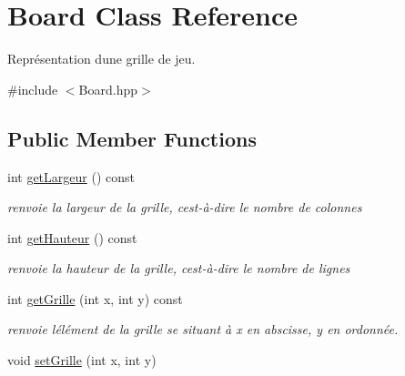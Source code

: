 \hypertarget{classBoard}{}\section{Board Class Reference}
\label{classBoard}


Représentation d\textquotesingle{}une grille de jeu.  




{\ttfamily \#include $<$Board.\+hpp$>$}

\subsection*{Public Member Functions}
\begin{DoxyCompactItemize}
\item 
\mbox{\label{classBoard_ac7cfff6987702708f85280af70e6c7b4}} 
int \hyperlink{classBoard_ac7cfff6987702708f85280af70e6c7b4}{get\+Largeur} () const
\begin{DoxyCompactList}\small\item\em renvoie la largeur de la grille, c\textquotesingle{}est-\/à-\/dire le nombre de colonnes \end{DoxyCompactList}\item 
\mbox{\label{classBoard_af69f2b14974e2c6b7fcffa3fef58340f}} 
int \hyperlink{classBoard_af69f2b14974e2c6b7fcffa3fef58340f}{get\+Hauteur} () const
\begin{DoxyCompactList}\small\item\em renvoie la hauteur de la grille, c\textquotesingle{}est-\/à-\/dire le nombre de lignes \end{DoxyCompactList}\item 
\mbox{\label{classBoard_aea48e2901225f0fae6af38096fb16ef8}} 
int \hyperlink{classBoard_aea48e2901225f0fae6af38096fb16ef8}{get\+Grille} (int x, int y) const
\begin{DoxyCompactList}\small\item\em renvoie l\textquotesingle{}élément de la grille se situant à x en abscisse, y en ordonnée. \end{DoxyCompactList}\item 
\mbox{\label{classBoard_a7c06f0c081a6a037fa65204a7a9badd2}} 
void \hyperlink{classBoard_a7c06f0c081a6a037fa65204a7a9badd2}{set\+Grille} (int x, int y)

\end{DoxyCompactItemize}
